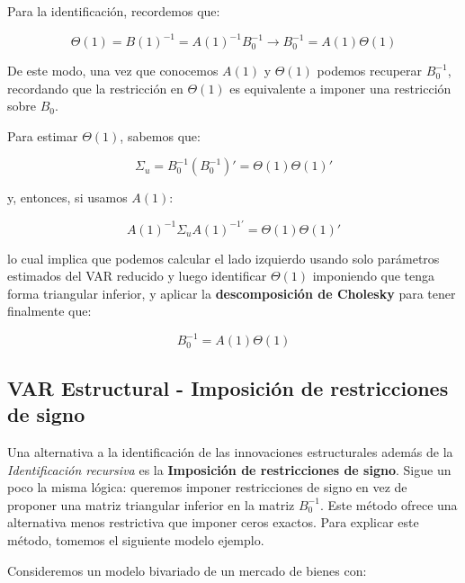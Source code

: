 \documentclass[
]{book}
\begin{document}
Para la identificación, recordemos que:

\begin{equation}
\Theta (1) = B(1)^{-1} = A(1)^{-1} B_0^{-1} \rightarrow B_0^{-1} = A(1) \Theta(1)
\end{equation}

De este modo, una vez que conocemos \(A(1)\) y \(\Theta(1)\) podemos recuperar \(B_0^{-1}\), recordando que la restricción en \(\Theta(1)\) es equivalente a imponer una restricción sobre \(B_0\).

Para estimar \(\Theta(1)\), sabemos que:

\begin{equation}
\Sigma_u = B_0^{-1} (B_0^{-1})' = \Theta(1) \Theta(1)'
\end{equation}

y, entonces, si usamos \(A(1)\):

\begin{equation}
A(1)^{-1} \Sigma_u A(1)^{-1'} = \Theta(1) \Theta(1)'
\end{equation}

lo cual implica que podemos calcular el lado izquierdo usando solo parámetros estimados del VAR reducido y luego identificar \(\Theta(1)\) imponiendo que tenga forma triangular inferior, y aplicar la \textbf{descomposición de Cholesky} para tener finalmente que:

\begin{equation}
B_0^{-1} = A(1) \Theta (1)
\end{equation}

\hypertarget{var-estructural---imposiciuxf3n-de-restricciones-de-signo}{%
\subsection{VAR Estructural - Imposición de restricciones de signo}\label{var-estructural---imposiciuxf3n-de-restricciones-de-signo}}

Una alternativa a la identificación de las innovaciones estructurales además de la \emph{Identificación recursiva} es la \textbf{Imposición de restricciones de signo}. Sigue un poco la misma lógica: queremos imponer restricciones de signo en vez de proponer una matriz triangular inferior en la matriz \(B_0^{-1}\). Este método ofrece una alternativa menos restrictiva que imponer ceros exactos. Para explicar este método, tomemos el siguiente modelo ejemplo.

Consideremos un modelo bivariado de un mercado de bienes con:
\end{document}
